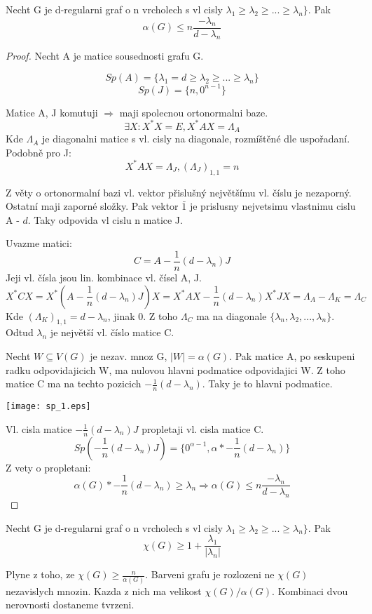 \begin{theorem}
	Necht G je d-regularni graf o n vrcholech s vl cisly $\lambda_1 \geq \lambda_2 \geq ... \geq \lambda_n \}$. Pak
	\[ \alpha(G) \leq n \frac{-\lambda_n}{d - \lambda_n} \]
\end{theorem}
\begin{proof}
	Necht A je matice sousednosti grafu G.

	\[ Sp(A) = \{\lambda_1 = d \geq \lambda_2 \geq ... \geq \lambda_n \} \]
	\[ Sp(J) = \{n, 0^{n-1} \} \]

	Matice A, J komutuji $\Rightarrow$ maji spolecnou ortonormalni baze.
	\[ \exists X: X^{\ast}X = E, X^{\ast}AX = \Lambda_A \]
	Kde $\Lambda_A$ je diagonalni matice s vl. cisly na diagonale, rozmíštěné dle uspořadaní. Podobně pro J:
	\[ X^{\ast}AX = \Lambda_J, (\Lambda_J)_{1,1} = n \]

	Z věty o ortonormalní bazi vl. vektor přislušný největšímu vl. číslu je nezaporný. Ostatní maji zaporné složky.
	Pak vektor $\bar{1}$ je prislusny nejvetsimu vlastnimu cislu A - $d$.
	Taky odpovida vl cislu n matice J.

 	Uvazme matici:
	\[ C = A - \frac{1}{n}(d - \lambda_n)J \]
	Jeji vl. čísla jsou lin. kombinace vl. čísel A, J.
	\[ X^{\ast}CX = X^{\ast}(A - \frac{1}{n}(d - \lambda_n)J)X = X^{\ast}AX - \frac{1}{n}(d - \lambda_n)X^{\ast}JX = \Lambda_A - \Lambda_K = \Lambda_C \]
	Kde $(\Lambda_K)_{1,1} = d - \lambda_n$, jinak 0. Z toho $\Lambda_C$ ma na diagonale $\{ \lambda_n, \lambda_2,..., \lambda_n \}$.
	Odtud $\lambda_n$ je největší vl. číslo matice C.

	Necht $W \subseteq V(G)$ je nezav. mnoz G, $|W| = \alpha(G)$. Pak matice A, po seskupeni radku odpovidajicich W, ma nulovou hlavni podmatice odpovidajici W.
	Z toho matice C ma na techto pozicich $-\frac{1}{n}(d - \lambda_n)$. Taky je to hlavni podmatice.

	\texttt{[image: sp\_1.eps]}

	Vl. cisla matice $-\frac{1}{n}(d - \lambda_n)J$ propletaji vl. cisla matice C.
	\[ Sp\left(-\frac{1}{n}(d - \lambda_n)J\right) = \{0^{\alpha - 1}, \alpha * -\frac{1}{n}(d - \lambda_n) \} \]
	Z vety o propletani:
	\[ \alpha(G) * -\frac{1}{n}(d - \lambda_n) \geq \lambda_n \Rightarrow \alpha(G) \leq n \frac{-\lambda_n}{d - \lambda_n} \]
\end{proof}

\begin{consequence}
	Necht G je d-regularni graf o n vrcholech s vl cisly $\lambda_1 \geq \lambda_2 \geq ... \geq \lambda_n \}$. Pak
	\[ \chi(G) \geq 1 + \frac{\lambda_1}{|\lambda_n|} \]

	Plyne z toho, ze $ \chi(G) \geq \frac{n}{\alpha(G)}$. Barveni grafu je rozlozeni ne $\chi(G)$ nezavislych mnozin. Kazda z nich ma velikost $\chi(G)/\alpha(G)$. Kombinaci dvou nerovnosti dostaneme tvrzeni.
\end{consequence}


